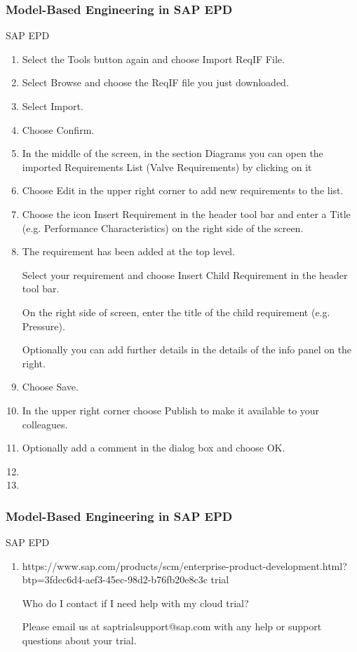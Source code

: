\begin{frame}
\frametitle{Model-Based Engineering in SAP EPD}
\begin{block}{SAP EPD}

\begin{enumerate}


\item  Select the Tools button again and choose Import ReqIF File.

\item  Select Browse and choose the ReqIF file you just downloaded.
\item  Select Import.
\item  Choose Confirm.
\item  In the middle of the screen, in the section Diagrams you can open the imported Requirements List (Valve Requirements) by clicking on it
  
\item  Choose Edit in the upper right corner to add new requirements to the list.
\item  Choose the icon Insert Requirement in the header tool bar and enter a Title (e.g. Performance Characteristics) on the right side of the screen.
\item The requirement has been added at the top level.

Select your requirement and choose Insert Child Requirement in the header tool bar.

On the right side of screen, enter the title of the child requirement (e.g. Pressure).

Optionally you can add further details in the details of the info panel on the right.
\item  Choose Save.
\item  In the upper right corner choose Publish to make it available to your colleagues.
\item  Optionally add a comment in the dialog box and choose OK.
\item 
\item 
  
\end{enumerate}
\end{block}
\end{frame}



\newpage 

\begin{frame}
\frametitle{Model-Based Engineering in SAP EPD}
\begin{block}{SAP EPD}

\begin{enumerate}

\item https://www.sap.com/products/scm/enterprise-product-development.html?btp=3fdec6d4-aef3-45ec-98d2-b76fb20e8c3c  trial

 	
Who do I contact if I need help with my cloud trial?

Please email us at saptrialsupport@sap.com with any help or support questions about your trial.
\end{enumerate}
\end{block}
\end{frame}


